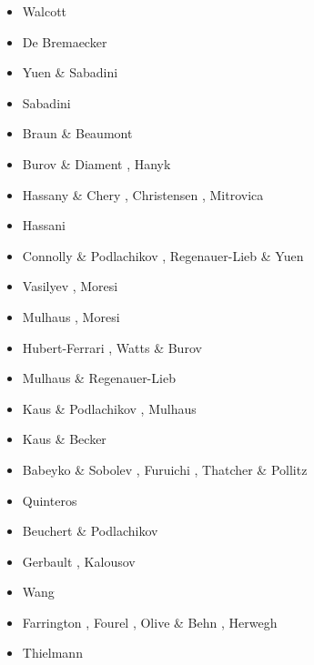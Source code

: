 \begin{scriptsize}
\begin{itemize}
\item[\nineteenseventy] Walcott \cite{walc70} 
\item[\nineteenseventyseven] De Bremaecker \cite{debr77}
\item[\nineteeneightyfour] Yuen \& Sabadini \cite{yusa84}
\item[\nineteeneightysix] Sabadini \etal \cite{sayp86}
\item[\nineteeneightyseven] Braun \& Beaumont \cite{brbe87}
\item[\nineteenninetyfive] Burov \& Diament \cite{budi95}, Hanyk \etal \cite{hamy95}
\item[\nineteenninetysix] Hassany \& Chery \cite{hach96b}, Christensen \cite{chri96b}, Mitrovica \cite{mitr96}
\item[\nineteenninetyseven] Hassani \etal \cite{hajc97}
\item[\nineteenninetyeight] Connolly \& Podlachikov \cite{copo98}, Regenauer-Lieb \& Yuen \cite{reyu98}
\item[\twothousandone] Vasilyev \etal \cite{vapy01}, Moresi \etal \cite{modm01}
\item[\twothousandtwo] Mulhaus \etal \cite{mumh02}, Moresi \etal \cite{modm02}
\item[\twothousandthree] Hubert-Ferrari \etal \cite{hukm03}, Watts \& Burov \cite{wabu03}
\item[\twothousandfive] Mulhaus \& Regenauer-Lieb \cite{mure05}
\item[\twothousandsix] Kaus \& Podlachikov \cite{kapo06}, Mulhaus \etal \cite{mudm06}
\item[\twothousandseven] Kaus \& Becker \cite{kabe07}
\item[\twothousandeight] Babeyko \& Sobolev \cite{baso08}, Furuichi \etal \cite{fukk08}, 
                   Thatcher \& Pollitz \cite{thpo08}
\item[\twothousandnine] Quinteros \etal \cite{qurj09}
\item[\twothousandten] Beuchert \& Podlachikov \cite{bepo10}
\item[\twothousandtwelve] Gerbault \cite{gerb12}, Kalousov \etal \cite{kasc12}
\item[\twothousandthirteen] Wang \etal \cite{wahd13}
\item[\twothousandfourteen] Farrington \etal \cite{famc14}, Fourel \etal \cite{fogm14},
                      Olive \& Behn \cite{olbe14}, Herwegh \etal \cite{hepk14}
\item[\twothousandfifteen] Thielmann \etal \cite{thkp15}

\end{itemize}
\end{scriptsize}
